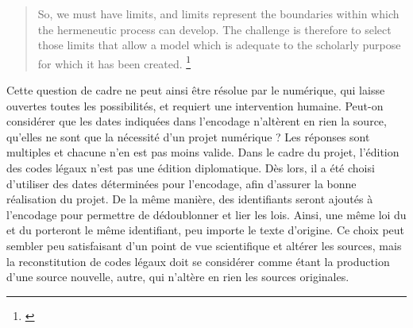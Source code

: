 \begin{quote}
    So, we must have limits, and limits represent the boundaries within which the hermeneutic
process can develop. The challenge is therefore to select those limits that allow a model
which is adequate to the scholarly purpose for which it has been created.
\footnote{\cite{pierazzo_rationale_2011}}
\end{quote}

Cette question de cadre ne peut ainsi être résolue par le numérique, qui laisse ouvertes toutes les possibilités, et requiert une intervention humaine. Peut-on considérer que les dates indiquées dans l'encodage n'altèrent en rien la source, qu'elles ne sont que la nécessité d'un projet numérique ? Les réponses sont multiples et chacune n'en est pas moins valide. Dans le cadre du projet, l'édition des codes légaux n'est pas une édition diplomatique. Dès lors, il a été choisi d'utiliser des dates déterminées pour l'encodage, afin d'assurer la bonne réalisation du projet. De la même manière, des identifiants \XML seront ajoutés à l'encodage \TEI pour permettre de dédoublonner et lier les lois. Ainsi, une même loi du \huidian et du \dc porteront le même identifiant, peu importe le texte d'origine. Ce choix peut sembler peu satisfaisant d'un point de vue scientifique et altérer les sources, mais la reconstitution de codes légaux doit se considérer comme étant la production d'une source nouvelle, autre, qui n'altère en rien les sources originales. 

